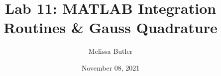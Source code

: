 \title{Lab 11: MATLAB Integration Routines \& Gauss Quadrature}
\author{Melissa Butler}
\date{November 08, 2021}